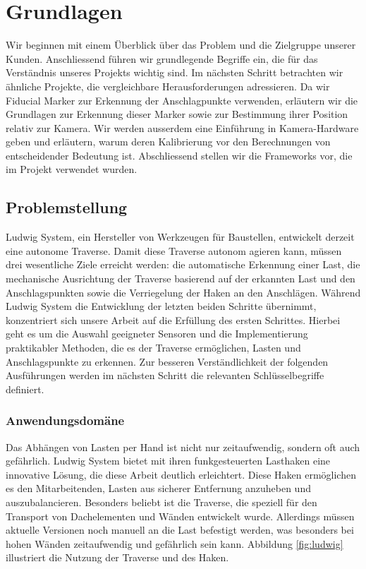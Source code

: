 \section{Grundlagen}
Wir beginnen mit einem Überblick über das Problem und die Zielgruppe unserer Kunden.
Anschliessend führen wir grundlegende Begriffe ein, die für das Verständnis unseres Projekts
wichtig sind. Im nächsten Schritt betrachten wir ähnliche Projekte, die vergleichbare Herausforderungen adressieren.
Da wir Fiducial Marker zur Erkennung der Anschlagpunkte verwenden, erläutern wir die Grundlagen zur 
Erkennung dieser Marker sowie zur Bestimmung ihrer Position relativ zur Kamera. Wir werden ausserdem eine Einführung in 
Kamera-Hardware geben und erläutern, warum deren Kalibrierung vor den Berechnungen von entscheidender Bedeutung ist.
Abschliessend stellen wir die Frameworks vor, die im Projekt verwendet wurden.

\subsection{Problemstellung}
Ludwig System, ein Hersteller von Werkzeugen für Baustellen, entwickelt derzeit eine autonome Traverse. Damit diese 
Traverse autonom agieren kann, müssen drei wesentliche Ziele erreicht werden: die automatische Erkennung einer Last, 
die mechanische Ausrichtung der Traverse basierend auf der erkannten Last und den Anschlagspunkten sowie die Verriegelung 
der Haken an den Anschlägen. Während Ludwig System die Entwicklung der letzten beiden Schritte übernimmt, konzentriert sich
unsere Arbeit auf die Erfüllung des ersten Schrittes. Hierbei geht es um die Auswahl geeigneter Sensoren und die Implementierung
praktikabler Methoden, die es der Traverse ermöglichen, Lasten und Anschlagspunkte zu erkennen. Zur besseren Verständlichkeit der 
folgenden Ausführungen werden im nächsten Schritt die relevanten Schlüsselbegriffe definiert.


\subsubsection{Anwendungsdomäne}
Das Abhängen von Lasten per Hand ist nicht nur zeitaufwendig, sondern oft auch gefährlich. 
Ludwig System bietet mit ihren funkgesteuerten Lasthaken eine innovative Lösung, 
die diese Arbeit deutlich erleichtert. Diese Haken ermöglichen es den Mitarbeitenden, 
Lasten aus sicherer Entfernung anzuheben und auszubalancieren. Besonders beliebt ist 
die Traverse, die speziell für den Transport von Dachelementen und Wänden entwickelt wurde. 
Allerdings müssen aktuelle Versionen noch manuell an die Last befestigt werden, 
was besonders bei hohen Wänden zeitaufwendig und gefährlich sein kann. 
Abbildung \ref{fig:ludwig} illustriert die Nutzung der Traverse und des Haken.

